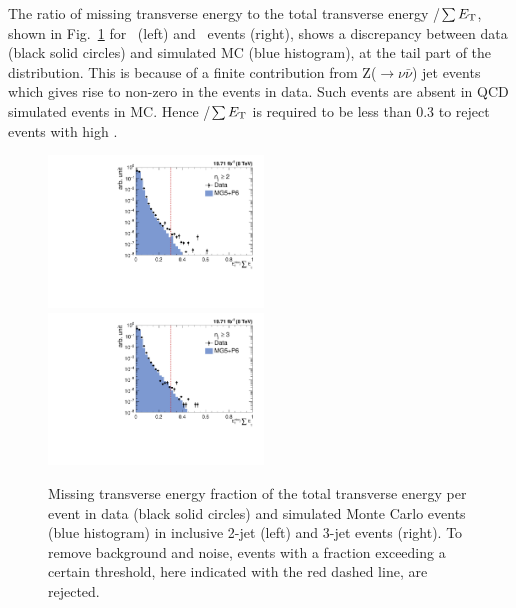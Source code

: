 The ratio of missing transverse energy to the total transverse energy \ETmiss/$\sum E_{\mathrm{T}}$, shown in Fig.~\ref{fig:metcut} for \njt~(left) and \njth~events (right), shows a discrepancy between data (black solid circles) and simulated MC (blue histogram), at the tail part of the distribution. This is because of a  finite contribution from Z($\rightarrow \nu \bar{\nu}$) \plus jet events which gives rise to non-zero \ET in the events in data. Such events are absent in QCD simulated events in MC. Hence \ETmiss/$\sum E_{\mathrm{T}}$ is required to be less than 0.3 to reject events with high \ETmiss.

\begin{figure}[!htbp]
\centering
 \hspace*{-2mm}\includegraphics[width=0.51\textwidth]{Plots_HT_2_150/Missing_ET_2.pdf}%
 ~~\includegraphics[width=0.51\textwidth]{Plots_HT_2_150/Missing_ET_3.pdf}
 \caption{Missing transverse energy fraction of the total transverse energy per event in data (black solid circles) and simulated Monte Carlo events (blue histogram) in inclusive 2-jet (left) and 3-jet events (right). To remove background and noise, events with a fraction exceeding a certain threshold, here indicated with the red dashed line, are rejected.}
 \label{fig:metcut}
\end{figure} 


